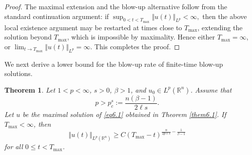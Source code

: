 \documentclass[12pt, reqno]{amsart}
\newtheorem{theorem}{Theorem}[section]
\theoremstyle{definition}
\theoremstyle{remark}
\numberwithin{equation}{section}
\begin{document}
\begin{proof}
The maximal extension and the blow-up alternative follow from the standard continuation argument: if $ \sup_{0<t<T_{\max}}
    \Vert u(t)\Vert_{L^p}<\infty,$ then the above local existence argument may be restarted at times close to $T_{\max}$, extending the solution beyond $T_{\max}$, which is impossible by maximality. Hence either $T_{\max}=\infty$, or $\lim_{t\to T_{\max}}
    \Vert u(t)\Vert_{L^p}
    =
    \infty.$
This completes the proof.
\end{proof}


We next derive a lower bound for the blow-up rate of finite-time blow-up solutions.

\begin{theorem}
\label{blowuprate}
Let $1<p<\infty$, $s>0$, $\beta>1$, and $u_0\in L^p(\mathbb R^n)$. Assume that
\[
    p>p_c^s:=\frac{n(\beta-1)}{2\ell s}.
\]
Let $u$ be the maximal solution of \eqref{eq6.1} obtained in Theorem \ref{them6.1}. If $T_{\max}<\infty$, then
\[
    \Vert u(t)\Vert_{L^p(\mathbb R^n)}
    \geq
    C
    (T_{\max}-t)^{
    \frac{n}{2p\ell s}
    -
    \frac{1}{\beta-1}
    }
\]
for all $0\leq t<T_{\max}$.
\end{theorem}
\end{document}
